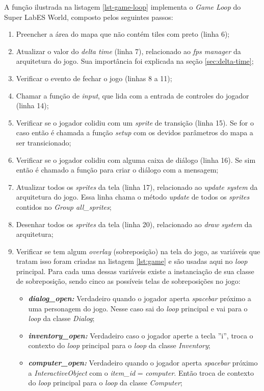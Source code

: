 A função ilustrada na listagem \ref{lst-game-loop} implementa o \textit{Game Loop} do Super LabES World, composto pelos seguintes passos:
\begin{enumerate}
    \item Preencher a área do mapa que não contém tiles com preto (linha 6);
    \item Atualizar o valor do \textit{delta time} (linha 7), relacionado ao \textit{fps manager} da arquitetura do jogo. Sua importância foi explicada na seção \ref{sec:delta-time};
    \item Verificar o evento de fechar o jogo (linhas 8 a 11);
    \item Chamar a função de \textit{input}, que lida com a entrada de controles do jogador (linha 14);
    \item Verificar se o jogador colidiu com um \textit{sprite} de transição (linha 15). Se for o caso então é chamada a função \textit{setup} com os devidos parâmetros do mapa a ser transicionado;
    \item Verificar se o jogador colidiu com alguma caixa de diálogo (linha 16). Se sim então é chamado a função para criar o diálogo com a mensagem;
    \item Atualizar todos os \textit{sprites} da tela (linha 17), relacionado ao \textit{update system} da arquitetura do jogo. Essa linha chama o método \textit{update} de todos os \textit{sprites} contidos no \textit{Group all\_sprites}; 
    \item Desenhar todos os \textit{sprites} da tela (linha 20), relacionado ao \textit{draw system} da arquitetura;
    \item Verificar se tem algum \textit{overlay} (sobreposição) na tela do jogo, as variáveis que tratam isso foram criadas na listagem \ref{lst:game} e são usadas aqui no \textit{loop} principal. Para cada uma dessas variáveis existe a instanciação de sua classe de sobreposição, sendo cinco as possíveis telas de sobreposições no jogo:
        \begin{itemize}
        \item \textit{\textbf{dialog\_open: }} Verdadeiro quando o jogador aperta \textit{spacebar} próximo a uma personagem do jogo. Nesse caso sai do \textit{loop} principal e vai para o \textit{loop} da classe \textit{Dialog};
        \item \textit{\textbf{inventory\_open: }}Verdadeiro caso o jogador aperte a tecla ''i'', troca o contexto do \textit{loop} principal para o \textit{loop} da classe \textit{Inventory}; 
        \item \textit{\textbf{computer\_open: }} Verdadeiro quando o jogador aperta \textit{spacebar} próximo a \textit{InteractiveObject} com o \textit{item\_id} = \textit{computer}. Então troca de contexto do \textit{loop} principal para o \textit{loop} da classe \textit{Computer};

\end{itemize}
\end{enumerate}
